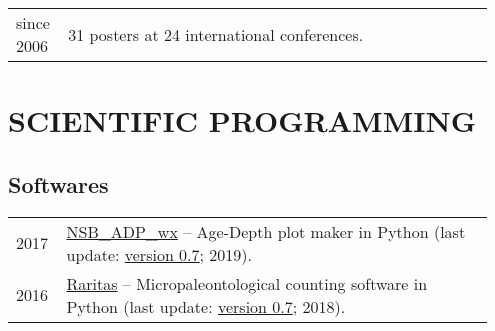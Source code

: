 \documentclass[11pt, a4paper]{article}
\begin{document}
\begin{longtable}{p{0.1\linewidth} P{0.85\linewidth}}
since 2006 & 31 posters at 24 international conferences.
\end{longtable}

\section{SCIENTIFIC PROGRAMMING}
\subsection{Softwares}
\begin{longtable}{p{0.1\linewidth} P{0.85\linewidth}}
2017 & \href{http://github.com/plannapus/NSB_ADP_wx/releases}{NSB\_ADP\_wx} -- Age-Depth plot maker in Python (last update: \href{http://doi.org/10.5281/zenodo.3408657}{version 0.7}; 2019).\\
2016 & \href{http://github.com/plannapus/Raritas/releases}{Raritas} -- Micropaleontological counting software in Python (last update: \href{https://github.com/plannapus/Raritas/releases/tag/v0.7}{version 0.7}; 2018).\\
\end{longtable}
\end{document}

